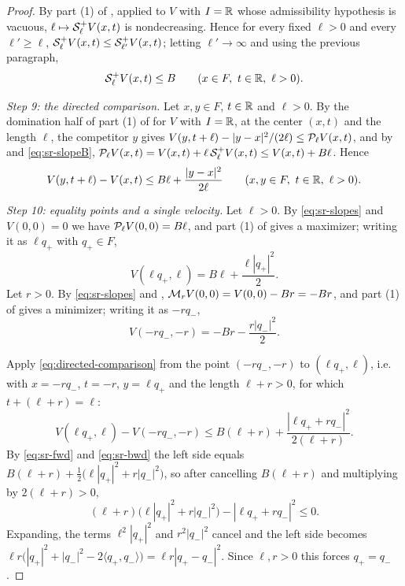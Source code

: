 \begin{proof}
By part (1) of , applied to $V$ with $I=\mathbb{R}$
whose admissibility hypothesis is vacuous, $\ell\mapsto\mathcal{S}_\ell^+V(x,t)$ is
nondecreasing. Hence for every fixed $\ell>0$ and every $\ell'\ge\ell$,
$\mathcal{S}_\ell^+V(x,t)\le\mathcal{S}_{\ell'}^+V(x,t)$; letting $\ell'\to\infty$ and using
the previous paragraph,
\begin{equation}\label{eq:sr-slopeB}
  \Senv_\ell^+V(x,t)\le B\qquad(x\in F,\ t\in\R,\ \ell>0).
\end{equation}

\emph{Step 9: the directed comparison.}
Let $x,y\in F$, $t\in\mathbb{R}$ and $\ell>0$. By the domination half of part (1) of
 for $V$ with $I=\mathbb{R}$, at the center $(x,t)$
and the length $\ell$, the competitor $y$
gives $V(y,t+\ell)-|y-x|^2/(2\ell)\le\mathcal{P}_\ell V(x,t)$, and by
 and \eqref{eq:sr-slopeB},
$\mathcal{P}_\ell V(x,t)=V(x,t)+\ell\,\mathcal{S}_\ell^+V(x,t)\le V(x,t)+B\ell$. Hence
\begin{equation}\label{eq:directed-comparison}
  V(y,t+\ell)-V(x,t)\le B\ell+\frac{|y-x|^2}{2\ell}
       \qquad(x,y\in F,\ t\in\mathbb{R},\ \ell>0).
\end{equation}

\emph{Step 10: equality points and a single velocity.}
Let $\ell>0$. By \eqref{eq:sr-slopes} and $V(0,0)=0$ we have
$\mathcal{P}_\ell V(0,0)=B\ell$, and part (1) of  gives a
maximizer; writing it as $\ell q_+$ with $q_+\in F$,
\begin{equation}\label{eq:sr-fwd}
  V(\ell q_+,\ell)=B\ell+\frac{\ell|q_+|^2}{2}.
\end{equation}
Let $r>0$. By \eqref{eq:sr-slopes} and ,
$\mathcal{M}_rV(0,0)=V(0,0)-Br=-Br$, and part (1) of  gives a
minimizer; writing it as $-rq_-$,
\begin{equation}\label{eq:sr-bwd}
  V(-rq_-,-r)=-Br-\frac{r|q_-|^2}{2}.
\end{equation}

Apply \eqref{eq:directed-comparison} from the point $(-rq_-,-r)$ to
$(\ell q_+,\ell)$, i.e. with $x=-rq_-$, $t=-r$, $y=\ell q_+$ and the length
$\ell+r>0$, for which $t+(\ell+r)=\ell$:
\[
  V(\ell q_+,\ell)-V(-rq_-,-r)\le B(\ell+r)
    +\frac{|\ell q_++rq_-|^2}{2(\ell+r)} .
\]
By \eqref{eq:sr-fwd} and \eqref{eq:sr-bwd} the left side equals
$B(\ell+r)+\tfrac12\bigl(\ell|q_+|^2+r|q_-|^2\bigr)$, so after cancelling
$B(\ell+r)$ and multiplying by $2(\ell+r)>0$,
\[
  (\ell+r)\bigl(\ell|q_+|^2+r|q_-|^2\bigr)-|\ell q_++rq_-|^2\le0 .
\]
Expanding, the terms $\ell^2|q_+|^2$ and $r^2|q_-|^2$ cancel and the left side
becomes
$\ell r\bigl(|q_+|^2+|q_-|^2-2\langle q_+,q_-\rangle\bigr)=\ell r|q_+-q_-|^2$.
Since $\ell,r>0$ this forces $q_+=q_-$.


\end{proof}
